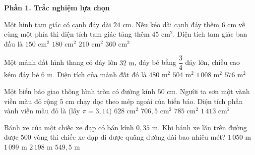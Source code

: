 \textbf{Phần 1. Trắc nghiệm lựa chọn}

\begin{ex} %
Một hình tam giác có cạnh đáy dài $24\text{ cm}$. Nếu kéo dài cạnh đáy thêm $6\text{ cm}$ về cùng một phía thì diện tích tam giác tăng thêm $45\text{ cm}^2$. Diện tích tam giác ban đầu là
\choice
{$150\text{ cm}^2$}
{\True $180\text{ cm}^2$}
{$210\text{ cm}^2$}
{$360\text{ cm}^2$}
\end{ex}

\begin{ex} %
Một mảnh đất hình thang có đáy lớn $32\text{ m}$, đáy bé bằng $\dfrac{3}{4}$ đáy lớn, chiều cao kém đáy bé $6\text{ m}$. Diện tích của mảnh đất đó là
\choice
{$480\text{ m}^2$}
{\True $504\text{ m}^2$}
{$1\,008\text{ m}^2$}
{$576\text{ m}^2$}
\end{ex}

\begin{ex} %
Một biển báo giao thông hình tròn có đường kính $50\text{ cm}$. Người ta sơn một vành viền màu đỏ rộng $5\text{ cm}$ chạy dọc theo mép ngoài của biển báo. Diện tích phần vành viền màu đỏ là (lấy $\pi = 3{,}14$)
\choice
{$628\text{ cm}^2$}
{\True $706{,}5\text{ cm}^2$}
{$785\text{ cm}^2$}
{$1\,413\text{ cm}^2$}
\end{ex}

\begin{ex} %
Bánh xe của một chiếc xe đạp có bán kính $0{,}35\text{ m}$. Khi bánh xe lăn trên đường được $500$ vòng thì chiếc xe đạp đi được quãng đường dài bao nhiêu mét?
\choice
{$1\,050\text{ m}$}
{\True $1\,099\text{ m}$}
{$2\,198\text{ m}$}
{$549{,}5\text{ m}$}
\end{ex}

